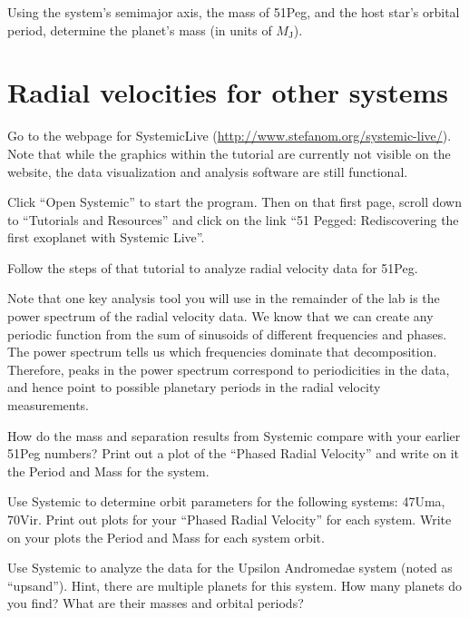 \begin{steps}
	\item Using the system's semimajor axis, the mass of 51Peg, and the host star’s orbital period, determine the planet’s mass (in units of $M_\textrm{J}$).
\end{steps}

\section{Radial velocities for other systems}

\begin{steps}
	\item Go to the webpage for SystemicLive (\url{http://www.stefanom.org/systemic-live/}). Note that while the graphics within the tutorial are currently not visible on the website, the data visualization and analysis software are still functional.
	
	\item Click ``Open Systemic'' to start the program. Then on that first page, scroll down to ``Tutorials and Resources'' and click on the link ``51 Pegged: Rediscovering the first exoplanet with Systemic Live''.
	
	\item Follow the steps of that tutorial to analyze radial velocity data for 51Peg.
\end{steps}

Note that one key analysis tool you will use in the remainder of the lab is the power spectrum of the radial velocity data. We know that we can create any periodic function from the sum of sinusoids of different frequencies and phases. The power spectrum tells us which frequencies dominate that decomposition. Therefore, peaks in the power spectrum correspond to periodicities in the data, and hence point to possible planetary periods in the radial velocity measurements.

\begin{steps}
	\item How do the mass and separation results from Systemic compare with your earlier 51Peg numbers? Print out a plot of the ``Phased Radial Velocity'' and write on it the Period and Mass for the system.
	
	\item Use Systemic to determine orbit parameters for the following systems: 47Uma, 70Vir. Print out plots for your ``Phased Radial Velocity'' for each system. Write on your plots the Period and Mass for each system orbit.
	
	\item Use Systemic to analyze the data for the Upsilon Andromedae system (noted as ``upsand''). Hint, there are multiple planets for this system. How many planets do you find? What are their masses and orbital periods?
	
\end{steps}

